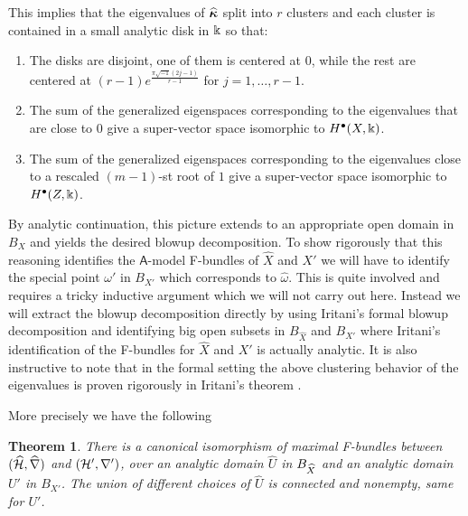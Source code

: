 \documentclass[twoside,leqno]{article}
\numberwithin{equation}{section}
\theoremstyle{plain}
\newtheorem{theorem}[equation]{Theorem}
\theoremstyle{definition}
\begin{document}
This implies that the eigenvalues of $\widehat{\boldsymbol{\kappa}}$ split into $r$ clusters and each cluster is contained  in a small analytic disk in $\Bbbk$ so that:

\begin{enumerate}[wide]
\item The disks are disjoint, one of them is centered at $0$,
while the rest are centered at \linebreak 
$(r-1)e^{\frac{\pi \sqrt{-1}(2j-1)}{r-1}}$ for $j=1,\dots,r-1$.
\item The sum of the generalized eigenspaces corresponding to
the eigenvalues that are close to $0$ give a super-vector space
isomorphic to  $H^{\bullet}(X,\Bbbk)$.
\item The sum of the generalized eigenspaces corresponding to the
eigenvalues  close to a rescaled $(m -
    1)$-st root of $1$ give a super-vector space isomorphic
to $H^{\bullet}(Z,\Bbbk)$.
\end{enumerate}


By analytic continuation, this picture extends to an appropriate open domain in $B_{X}$ and yields the desired blowup decomposition. To show rigorously that this reasoning identifies the $\mathsf{A}$-model F-bundles of $\widehat{X}$ and $X'$ we will have to identify the special point $\omega'$ in $B_{X'}$ which corresponds to $\widehat{\omega}$. This is quite involved and requires a tricky inductive argument which we will not carry out here. Instead we will extract the blowup decomposition directly by using Iritani's formal blowup decomposition \cite{Iritani_blowup} and identifying big open subsets in $B_{\widehat{X}}$  and $B_{X'}$ where Iritani's identification of the F-bundles 
for $\widehat{X}$ and $X'$ is actually analytic. It is also instructive to note that in the formal setting the above clustering behavior of the eigenvalues is proven rigorously in Iritani's theorem \cite[Theorem~5.8(6)]{Iritani_blowup}.

\medskip

More precisely we have the following

\begin{theorem} \label{thm:blowup}
  There is a canonical isomorphism of maximal F-bundles between $(\widehat{\mathcal H}, \widehat{\nabla})$ and $(\mathcal H', \nabla')$, over an analytic domain $\widehat{U}$ in $B_{\widehat{X}}$ and an analytic domain $U'$ in $B_{X'}$.
  The union of different choices of $\widehat{U}$ is connected and nonempty, same for $U'$.
\end{theorem}
\end{document}
